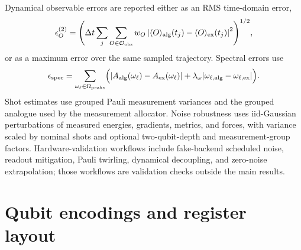 \documentclass[
  reprint,
  amsmath,
  amssymb,
  aps,
  pra,
  nofootinbib,
  superscriptaddress,
  floatfix
]{revtex4-2}
\newcommand{\Ocal}{\mathcal{O}}
\newcommand{\ex}{\mathrm{ex}}
\newcommand{\obs}{\mathrm{obs}}
\newcommand{\expval}[1]{\langle #1\rangle}
\begin{document}
Dynamical observable errors are reported either as an RMS time-domain error,
\begin{equation}
\epsilon_{O}^{(2)}=
\Biggl(\Delta t\sum_{j}\sum_{O\in\Ocal_{\obs}}w_O
\left|\expval{O}_{\rm alg}(t_j)-\expval{O}_{\ex}(t_j)\right|^2\Biggr)^{1/2},
\label{eq:appendix_obs_l2}
\end{equation}
or as a maximum error over the same sampled trajectory. Spectral errors use
\begin{equation}
\epsilon_{\rm spec}=\sum_{\omega_{\ell}\in\Omega_{\rm peaks}}
\Bigl(|A_{\rm alg}(\omega_{\ell})-A_{\ex}(\omega_{\ell})|
+\lambda_{\omega}|\omega_{\ell,\rm alg}-\omega_{\ell,\ex}|\Bigr).
\label{eq:appendix_spectral_error}
\end{equation}
Shot estimates use grouped Pauli measurement variances and the grouped analogue used by the measurement allocator. Noise robustness uses iid-Gaussian perturbations of measured energies, gradients, metrics, and forces, with variance scaled by nominal shots and optional two-qubit-depth and measurement-group factors. Hardware-validation workflows include fake-backend scheduled noise, readout mitigation, Pauli twirling, dynamical decoupling, and zero-noise extrapolation; those workflows are validation checks outside the main results.

\section{Qubit encodings and register layout}
\label{app:encodings}
\end{document}
